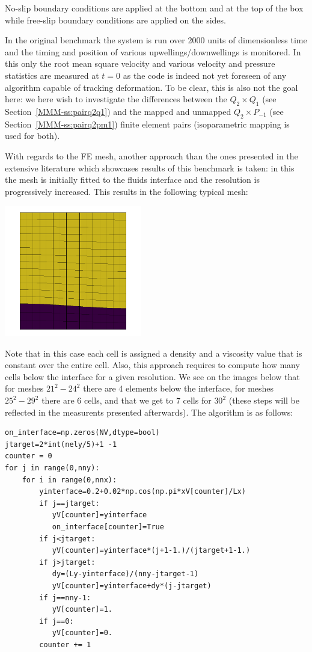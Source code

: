 No-slip boundary conditions are applied at the bottom and at the top of the box 
while free-slip boundary conditions are applied on the sides. 

In the original benchmark the system is run over 2000 units of dimensionless time and the 
timing and position of various upwellings/downwellings is monitored. 
In this \stone only the root mean square velocity and various velocity and pressure
statistics are measured at $t=0$ as the code is indeed not yet foreseen of any 
algorithm capable of tracking deformation.
To be clear, this is also not the goal here: we here wish to investigate the 
differences between the $Q_2\times Q_1$ (see Section~\ref{MMM-ss:pairq2q1})
and the mapped and unmapped $Q_2\times P_{-1}$ (see Section~\ref{MMM-ss:pairq2pm1})
finite element pairs (isoparametric mapping is used for both).

With regards to the FE mesh, another approach than the ones presented in the extensive 
literature which showcases results of this benchmark is taken: in this \stone the mesh 
is initially fitted to the fluids interface and the resolution is progressively increased. 
This results in the following typical mesh:

\begin{center}
\includegraphics[width=6cm]{python_codes/fieldstone_25/newresults/mats}
\end{center}
Note that in this case each cell is assigned a density and a viscosity value that 
is constant over the entire cell. 
Also, this approach requires to compute how many cells below the interface
for a given resolution. We see on the images below that for meshes $21^2-24^2$ there 
are 4 elements below the interface, for meshes $25^2-29^2$ there are 6 cells, and that 
we get to 7 cells for $30^2$ (these steps will be reflected in the measurents presented 
afterwards). The algorithm is as follows:
\begin{lstlisting}
on_interface=np.zeros(NV,dtype=bool) 
jtarget=2*int(nely/5)+1 -1 
counter = 0
for j in range(0,nny):
    for i in range(0,nnx):
        yinterface=0.2+0.02*np.cos(np.pi*xV[counter]/Lx)
        if j==jtarget:
           yV[counter]=yinterface
           on_interface[counter]=True
        if j<jtarget:
           yV[counter]=yinterface*(j+1-1.)/(jtarget+1-1.)
        if j>jtarget:
           dy=(Ly-yinterface)/(nny-jtarget-1)
           yV[counter]=yinterface+dy*(j-jtarget)
        if j==nny-1:
           yV[counter]=1.
        if j==0:
           yV[counter]=0.
        counter += 1
\end{lstlisting}

